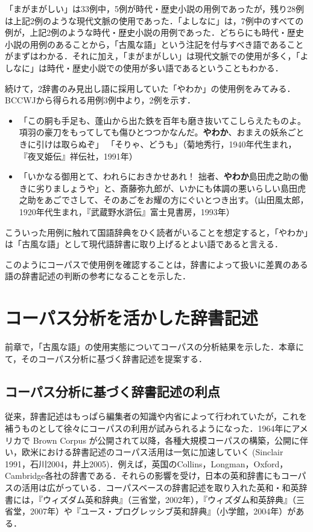 \documentclass[japanese]{jnlp_1.4}
\begin{document}
「まがまがしい」は33例中，5例が時代・歴史小説の用例であったが，残り28例は上記2例のような現代文脈の使用であった．「よしなに」は，7例中のすべての例が，上記2例のような時代・歴史小説の用例であった．どちらにも時代・歴史小説の用例のあることから，「古風な語」という注記を付与すべき語であることがまずはわかる．それに加え，「まがまがしい」は現代文脈での使用が多く，「よしなに」は時代・歴史小説での使用が多い語であるということもわかる．

続けて，2辞書のみ見出し語に採用していた「やわか」の使用例をみてみる．BCCWJから得られる用例3例中より，2例を示す．

\begin{itemize}
\item
「この胴も手足も、蓬山から出た鉄を百年も磨き抜いてこしらえたものよ。項羽の豪刀をもってしても傷ひとつつかなんだ。\textbf{やわか}、おまえの妖糸ごときに引けは取らぬぞ」 
「そりゃ、どうも」（菊地秀行，1940年代生まれ，『夜叉姫伝』祥伝社，1991年）

\item
「いかなる御用とて、われらにおきかせあれ！ 
拙者、\textbf{やわか}島田虎之助の働きに劣りましょうや」と、斎藤弥九郎が、いかにも体調の悪いらしい島田虎之助をあごでさして、そのあごをお耀の方にぐいとつき出す。（山田風太郎，1920年代生まれ，『武蔵野水滸伝』富士見書房，1993年）
\end{itemize}

こういった用例に触れて国語辞典をひく読者がいることを想定すると，「やわか」は「古風な語」として現代語辞書に取り上げるとよい語であると言える．

このようにコーパスで使用例を確認することは，辞書によって扱いに差異のある語の辞書記述の判断の参考になることを示した．


\section{コーパス分析を活かした辞書記述}

前章で，「古風な語」の使用実態についてコーパスの分析結果を示した．本章にて，そのコーパス分析に基づく辞書記述を提案する．


\subsection{コーパス分析に基づく辞書記述の利点}

従来，辞書記述はもっぱら編集者の知識や内省によって行われていたが，これを補うものとして徐々にコーパスの利用が試みられるようになった．1964年にアメリカで 
Brown Corpus が公開されて以降，各種大規模コーパスの構築，公開に伴い，欧米における辞書記述のコーパス活用は一気に加速していく (Sinclair 1991，石川2004，井上2005)．例えば，英国のCollins，Longman，Oxford，Cambridge各社の辞書である．それらの影響を受け，日本の英和辞書にもコーパスの活用は広がっている．コーパスベースの辞書記述を取り入れた英和・和英辞書には，『ウィズダム英和辞典』（三省堂，2002年），『ウィズダム和英辞典』（三省堂，2007年）や『ユース・プログレッシブ英和辞典』（小学館，2004年）がある．
\end{document}
